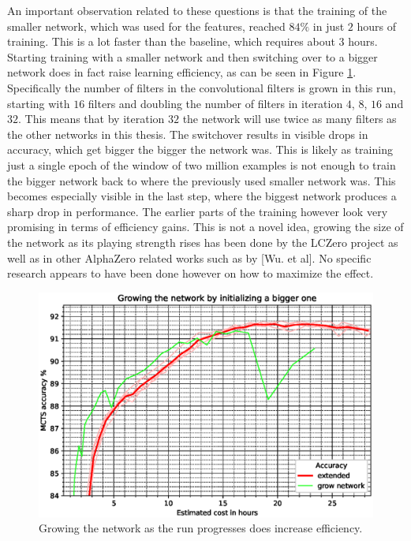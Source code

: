 \documentclass[12pt,onecolumn,oneside,titlepage]{article}
\begin{document}
An important observation related to these questions is that the training of the smaller network, which was used for the features, reached $84\%$ in just $2$ hours of training. This is a lot faster than the baseline, which requires about $3$ hours.
Starting training with a smaller network and then switching over to a bigger network does in fact raise learning efficiency, as can be seen in Figure \ref{fig:growNetwork}. Specifically the number of filters in the convolutional filters is grown in this run,
starting with $16$ filters and doubling the number of filters in iteration $4$, $8$, $16$ and $32$. This means that by iteration $32$ the network will use twice as many filters as the other networks in this thesis. The switchover results in visible
drops in accuracy, which get bigger the bigger the network was. This is likely as training just a single epoch of the window of two million examples is not enough to train the bigger network back to where the previously used smaller network was.
This becomes especially visible in the last step, where the biggest network produces a sharp drop in performance. The earlier parts of the training however look very promising in terms of efficiency gains.
This is not a novel idea, growing the size of the network as its playing strength rises has been done by the LCZero project \cite{lzNetworks} as well as in other AlphaZero related works such as by \cite{wu2019accelerating}[Wu. et al].
No specific research appears to have been done however on how to maximize the effect.

\begin{figure}[H]
\centering
\includegraphics[clip,width=\columnwidth]{growNetwork}
\caption{Growing the network as the run progresses does increase efficiency.}
\label{fig:growNetwork}
\end{figure}
\end{document}

